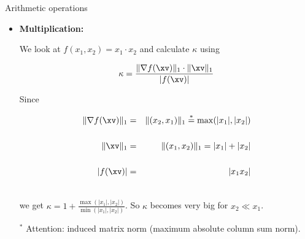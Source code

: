 \begin{vbframe}{Arithmetic operations}

\begin{itemize}

 \item \textbf{Multiplication:}

We look at $f(x_1, x_2) = x_1 \cdot x_2$ and calculate $\kappa$ using

$$
\kappa = \frac{\|\nabla f(\xv)\|_1 \cdot \|\xv\|_1}{|f(\xv)|}
$$

Since

\vspace*{-.5cm}

\begin{eqnarray*}
\|\nabla f(\xv)\|_1 &=& \|(x_2, x_1)\|_1 \overset{*}{=} \max (|x_1|, |x_2|)\\\\
\|\xv\|_1 &=& \|(x_1, x_2)\|_1 = |x_1| + |x_2| \\\\
|f(\xv)| &=& |x_1 x_2|\\\
\end{eqnarray*}

\vspace*{-.5cm}

we get $\kappa = 1 + \frac{\max(|x_1|, |x_2|)}{\min(|x_1|, |x_2|)}$. So $\kappa$ becomes very big for $x_2 \ll x_1$.


\begin{footnotesize}
$^*$ Attention: induced matrix norm (maximum absolute column sum norm).
\end{footnotesize}

 \framebreak

%
%
%


%
%
%
%


\end{itemize}
\end{vbframe}
